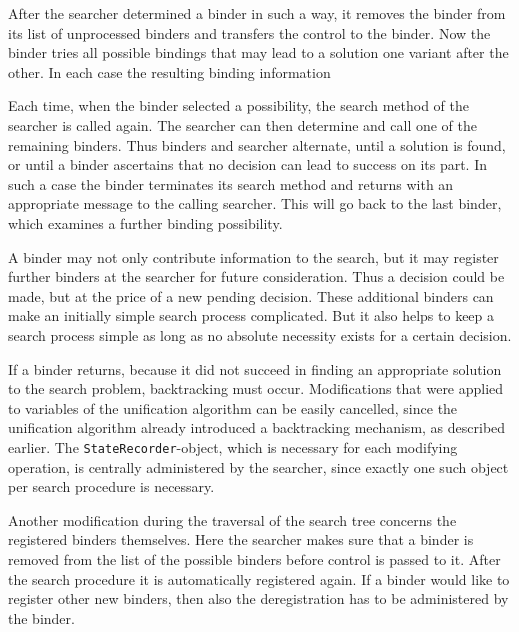 After the searcher determined a binder in such a way, 
it removes the binder from its list of unprocessed binders 
and transfers the control to the binder. Now the binder tries
all possible bindings that may lead to a solution one variant 
after the other. In each case the resulting binding information

Each time, when the binder selected a possibility, the search method 
of the searcher is called again. The searcher can then determine and 
call one of the remaining binders. Thus binders and searcher alternate, 
until a solution is found, or until a binder ascertains that no
decision can lead to success on its part. In such a case the binder 
terminates its search method and returns with an appropriate message 
to the calling searcher. This will go back to the last binder, 
which examines a further binding possibility. 

A binder may not only contribute information to the search, 
but it may register further binders at the searcher for 
future consideration. Thus a decision could be made, 
but at the price of a new pending decision. 
These additional binders can make an initially simple search 
process complicated. But it also helps to keep a search process 
simple as long as no absolute necessity exists for a certain decision. 

If a binder returns, because it did not succeed in finding
an appropriate solution to the search problem,
backtracking must occur.
Modifications that were applied to variables 
of the unification algorithm can be easily 
cancelled, since the unification algorithm already introduced 
a backtracking mechanism, as described earlier.
The \texttt{StateRecorder}-object, which is necessary for each 
modifying operation, is centrally administered by the searcher, 
since exactly one such object per search procedure is necessary. 

Another modification during the traversal of the search tree 
concerns the registered binders themselves. Here the searcher 
makes sure that a binder is removed 
from the list of the possible binders
before control is passed to it. After the search procedure 
it is automatically registered again. If a binder would like 
to register other new binders, then also the deregistration
has to be administered by the binder.


